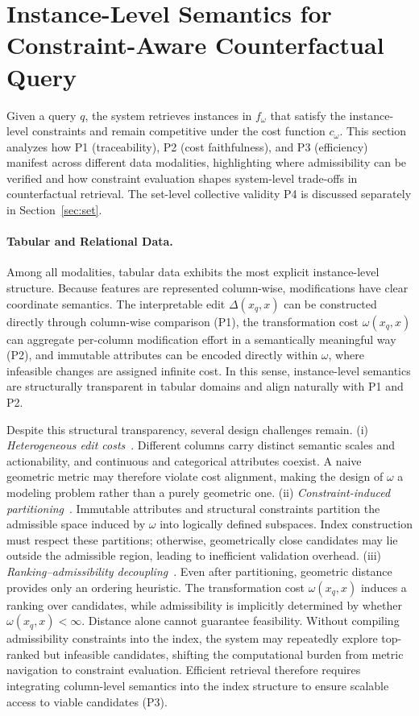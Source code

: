 \section{Instance-Level Semantics for Constraint-Aware Counterfactual Query}

% 
\label{sec:instance}
Given a query $q$, the system retrieves instances in $f_\omega$ that satisfy the instance-level constraints and remain competitive under the cost function $c_\omega$. This section analyzes how P1 (traceability), P2 (cost faithfulness), and P3 (efficiency) manifest across different data modalities, highlighting where admissibility can be verified and how constraint evaluation shapes system-level trade-offs in counterfactual retrieval. The set-level collective validity P4 is discussed separately in Section~\ref{sec:set}.


\paragraph{Tabular and Relational Data.}
Among all modalities, tabular data exhibits the most explicit instance-level structure. Because features are represented column-wise, modifications have clear coordinate semantics. The interpretable edit $\Delta(x_q,x)$ can be constructed directly through column-wise comparison (P1), the transformation cost $\omega(x_q,x)$ can aggregate per-column modification effort in a semantically meaningful way (P2), and immutable attributes can be encoded directly within $\omega$, where infeasible changes are assigned infinite cost. In this sense, instance-level semantics are structurally transparent in tabular domains and align naturally with P1 and P2.

Despite this structural transparency, several design challenges remain. (i) \emph{Heterogeneous edit costs}~\cite{karabulut2019weighted}. Different columns carry distinct semantic scales and actionability, and continuous and categorical attributes coexist. A naive geometric metric may therefore violate cost alignment, making the design of $\omega$ a modeling problem rather than a purely geometric one. (ii) \emph{Constraint-induced partitioning}~\cite{galhotra2022hyper}. Immutable attributes and structural constraints partition the admissible space induced by $\omega$ into logically defined subspaces. Index construction must respect these partitions; otherwise, geometrically close candidates may lie outside the admissible region, leading to inefficient validation overhead. (iii) \emph{Ranking–admissibility decoupling}~\cite{bartal2011fast}. Even after partitioning, geometric distance provides only an ordering heuristic. The transformation cost $\omega(x_q,x)$ induces a ranking over candidates, while admissibility is implicitly determined by whether $\omega(x_q,x) < \infty$. Distance alone cannot guarantee feasibility. Without compiling admissibility constraints into the index, the system may repeatedly explore top-ranked but infeasible candidates, shifting the computational burden from metric navigation to constraint evaluation. Efficient retrieval therefore requires integrating column-level semantics into the index structure to ensure scalable access to viable candidates (P3).


